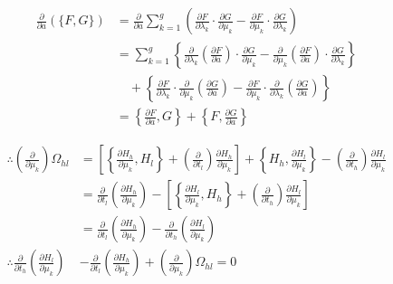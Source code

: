 \documentclass[paper=a4, fontsize=11pt]{jlreq} %
\theoremstyle{break}
\theoremstyle{qa}
\begin{document}
\begin{align*}
    \frac{\partial}{\partial a} (\{F, G\}) &= \frac{\partial}{\partial a} \sum_{k=1}^g \left( \frac{\partial F}{\partial \lambda_k} \cdot \frac{\partial G}{\partial \mu_k} - \frac{\partial F}{\partial \mu_k} \cdot \frac{\partial G}{\partial \lambda_k} \right) \\
    &= \sum_{k=1}^g \left\{ \frac{\partial}{\partial \lambda_k} \left( \frac{\partial F}{\partial a} \right) \cdot \frac{\partial G}{\partial \mu_k} - \frac{\partial}{\partial \mu_k} \left( \frac{\partial F}{\partial a} \right) \cdot \frac{\partial G}{\partial \lambda_k} \right\} \\
    &\quad + \left\{ \frac{\partial F}{\partial \lambda_k} \cdot \frac{\partial}{\partial \mu_k} \left( \frac{\partial G}{\partial a} \right) - \frac{\partial F}{\partial \mu_k} \cdot \frac{\partial}{\partial \lambda_k} \left( \frac{\partial G}{\partial a} \right) \right\} \\
    &= \left\{ \frac{\partial F}{\partial a}, G \right\} + \left\{ F, \frac{\partial G}{\partial a} \right\}
\end{align*}

\begin{align*}
    \therefore \left( \frac{\partial}{\partial \mu_k} \right) \Omega_{hl} &= \left[ \left\{ \frac{\partial H_h}{\partial \mu_k}, H_l \right\} + \left( \frac{\partial}{\partial t_l} \right) \frac{\partial H_h}{\partial \mu_k} \right] + \left\{ H_h, \frac{\partial H_l}{\partial \mu_k} \right\} - \left( \frac{\partial}{\partial t_h} \right) \frac{\partial H_l}{\partial \mu_k} \\
    &= \frac{\partial}{\partial t_l} \left( \frac{\partial H_h}{\partial \mu_k} \right) - \left[ \left\{ \frac{\partial H_l}{\partial \mu_k}, H_h \right\} + \left( \frac{\partial}{\partial t_h} \right) \frac{\partial H_l}{\partial \mu_k} \right] \\
    &= \frac{\partial}{\partial t_l} \left( \frac{\partial H_h}{\partial \mu_k} \right) - \frac{\partial}{\partial t_h} \left( \frac{\partial H_l}{\partial \mu_k} \right) \\
    \therefore \frac{\partial}{\partial t_h} \left( \frac{\partial H_l}{\partial \mu_k} \right) &- \frac{\partial}{\partial t_l} \left( \frac{\partial H_h}{\partial \mu_k} \right) + \left( \frac{\partial}{\partial \mu_k} \right) \Omega_{hl} = 0
\end{align*}
\end{document}
